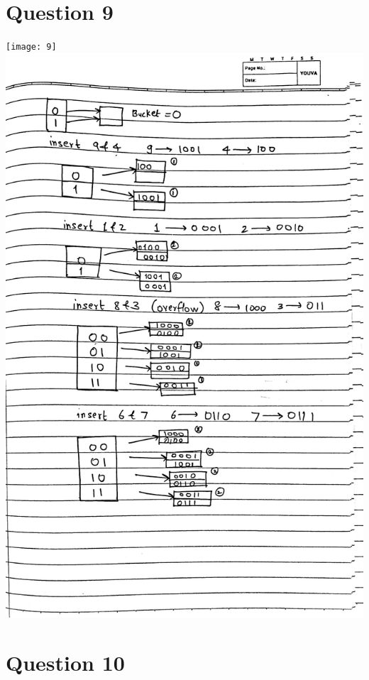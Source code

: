 \documentclass{article}
\begin{document}
  \section*{Question 9}
  \texttt{[image: 9]}
  \includegraphics[scale=0.1]{hashing}
  
  
  

  \section*{Question 10}
\end{document}
